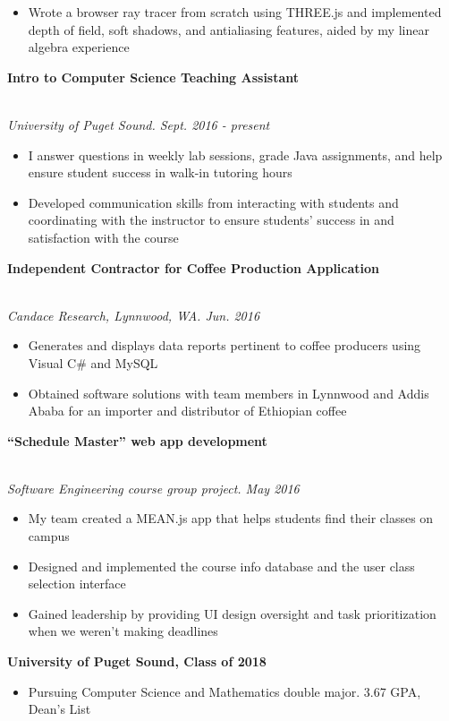 \documentclass[11pt]{article}
\newcommand\phv{\fontfamily{phv}\selectfont}
\begin{document}
\begin{itemize}
	\item Wrote a browser ray tracer from scratch using THREE.js and implemented depth of field, soft shadows, and antialiasing features, aided by my linear algebra experience
\end{itemize}
\noindent \centerline{\large \bf Intro to Computer Science Teaching Assistant \hfill }
\\\emph{University of Puget Sound. Sept. 2016 - present}
\begin{itemize}
  \item I answer questions in weekly lab sessions, grade Java assignments, and help ensure student success in walk-in tutoring hours
  \item Developed communication skills from interacting with students and coordinating with the instructor to ensure students' success in and satisfaction with the course
\end{itemize}
\noindent \centerline{\large \bf Independent Contractor for Coffee Production Application \hfill }
\\\emph{Candace Research, Lynnwood, WA. Jun. 2016}
\begin{itemize}
  \item Generates and displays data reports pertinent to coffee producers using Visual C\# and MySQL
  \item Obtained software solutions with team members in Lynnwood and Addis Ababa for an importer and distributor of Ethiopian coffee
\end{itemize}
\noindent \centerline{\large \bf ``Schedule Master'' web app development \hfill }
\\\emph{Software Engineering course group project. May 2016}
\begin{itemize}
  \item My team created a MEAN.js app that helps students find their classes on campus
  \item Designed and implemented the course info database and the user class selection interface
  \item Gained leadership by providing UI design oversight and task prioritization when we weren't making deadlines
\end{itemize}
\noindent{\LARGE \bf \phv{Education}  } \medskip \newline
\noindent \centerline{\large \bf University of Puget Sound, Class of 2018 \hfill }
\begin{itemize}
  \item Pursuing Computer Science and Mathematics double major. 3.67 GPA, Dean's List

\end{itemize}
\end{document}
